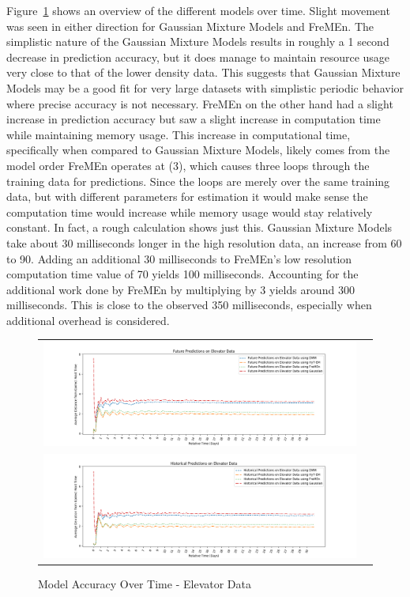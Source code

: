 Figure~\ref{figure:Model_Accuracy_Over_Time_Elevator_Data} shows an overview
of the different models over time. Slight movement was seen in either direction for Gaussian Mixture Models and
FreMEn. The simplistic nature of the Gaussian Mixture Models results in roughly
a 1 second decrease in prediction accuracy, but it does manage to maintain resource
usage very close to that of the lower density data. This suggests that Gaussian
Mixture Models may be a good fit for very large datasets with simplistic
periodic behavior where precise accuracy is not necessary. FreMEn on the other
hand had a slight increase in prediction accuracy but saw a slight increase in
computation time while maintaining memory usage. This increase in
computational time, specifically when compared to Gaussian Mixture Models,
likely comes from the model order FreMEn operates at (3), which causes
three loops through the training data for predictions. Since the loops are
merely over the same training data, but with different parameters for estimation
it would make sense the computation time would increase while memory usage would
stay relatively constant. In fact, a rough calculation shows just this. Gaussian
Mixture Models take about 30 milliseconds longer in the high resolution data,
an increase from 60 to 90. Adding an additional 30 milliseconds to FreMEn's
low resolution computation time value of 70 yields 100 milliseconds. Accounting
for the additional work done by FreMEn by multiplying by 3 yields around 300
milliseconds. This is close to the observed 350 milliseconds, especially when
additional overhead is considered. \\

\begin{center}
\begin{figure}[!Hp]
  \begin{tabular}{cc}
    {\includegraphics[width = 6in]{images/results/Future_Predictions_on_Elevator_Data.png}} \\
    {\includegraphics[width = 6in]{images/results/Historical_Predictions_on_Elevator_Data.png}} \\
  \end{tabular}
  \caption{Model Accuracy Over Time - Elevator Data}
  \label{figure:Model_Accuracy_Over_Time_Elevator_Data}
\end{figure}
\end{center}


